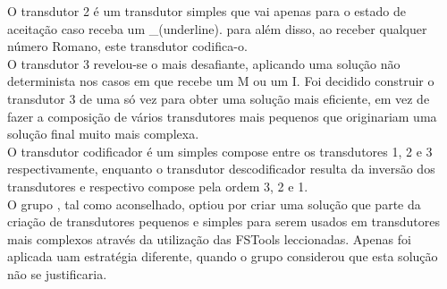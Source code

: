 \documentclass{article}
\begin{document}
O transdutor 2 é um transdutor simples que vai apenas para o estado de aceitação caso receba um \_(underline). para além disso, ao receber qualquer número Romano, este transdutor codifica-o.\\

O transdutor 3 revelou-se o mais desafiante, aplicando uma solução não determinista nos casos em que recebe um M ou um I. Foi decidido construir o transdutor 3 de uma só vez para obter uma solução mais eficiente, em vez de fazer a composição de vários transdutores mais pequenos que originariam uma solução final muito mais complexa.\\

O transdutor codificador é um simples compose entre os transdutores 1, 2 e 3 respectivamente, enquanto o transdutor descodificador resulta da inversão dos transdutores e respectivo compose pela ordem 3, 2 e 1.\\

O grupo , tal como aconselhado, optiou por criar uma solução que parte da criação de transdutores pequenos e simples para serem usados em transdutores mais complexos através da utilização das FSTools leccionadas. Apenas foi aplicada uam estratégia diferente, quando o grupo considerou que esta solução não se justificaria.\\
\end{document}
